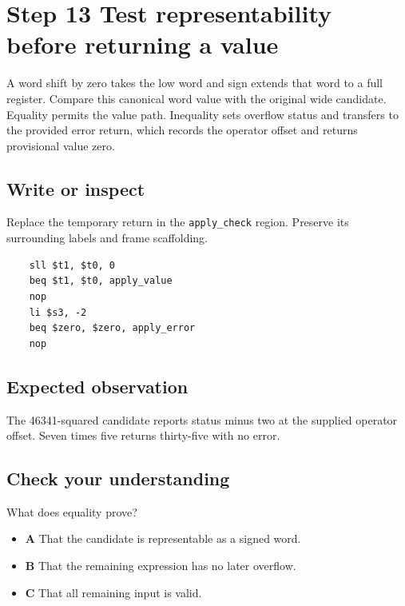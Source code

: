 \section{Step 13 Test representability before returning a value}\label{expression-s13}

A word shift by zero takes the low word and sign extends that word to a full register. Compare this canonical word value with the original wide candidate. Equality permits the value path. Inequality sets overflow status and transfers to the provided error return, which records the operator offset and returns provisional value zero.

\subsection{Write or inspect}
Replace the temporary return in the \texttt{apply\_check} region. Preserve its surrounding labels and frame scaffolding.

\begin{verbatim}
    sll $t1, $t0, 0
    beq $t1, $t0, apply_value
    nop
    li $s3, -2
    beq $zero, $zero, apply_error
    nop
\end{verbatim}
\subsection{Expected observation}
The 46341-squared candidate reports status minus two at the supplied operator offset. Seven times five returns thirty-five with no error.

\subsection{Check your understanding}
What does equality prove?

\begin{itemize}
  \item \textbf{A} That the candidate is representable as a signed word.
  \item \textbf{B} That the remaining expression has no later overflow.
  \item \textbf{C} That all remaining input is valid.
\end{itemize}

